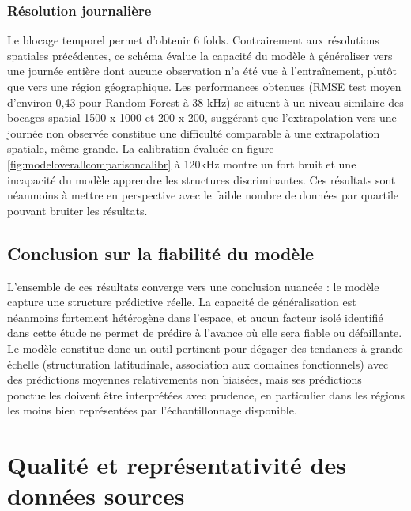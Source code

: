\documentclass[11pt,a4paper,oneside]{report}
\begin{document}
	\subsubsection{Résolution journalière}
	Le blocage temporel permet d'obtenir 6 folds. Contrairement aux résolutions spatiales précédentes, ce schéma évalue la capacité du modèle à généraliser vers une journée entière dont aucune observation n'a été vue à l'entraînement, plutôt que vers une région géographique. Les performances obtenues (RMSE test moyen d'environ 0,43 pour Random Forest à 38 kHz) se situent à un niveau similaire des bocages spatial 1500 x 1000 et 200 x 200, suggérant que l'extrapolation vers une journée non observée constitue une difficulté comparable à une extrapolation spatiale, même grande.
	La calibration évaluée en figure \ref{fig:modeloverallcomparisoncalibr} à 120kHz montre un fort bruit et une incapacité du modèle apprendre les structures discriminantes. Ces résultats sont néanmoins à mettre en perspective avec le faible nombre de données par quartile pouvant bruiter les résultats.  
	
	\subsection{Conclusion sur la fiabilité du modèle}
	L'ensemble de ces résultats converge vers une conclusion nuancée : le modèle capture une structure prédictive réelle. La capacité de généralisation est néanmoins fortement hétérogène dans l'espace, et aucun facteur isolé identifié dans cette étude ne permet de prédire à l'avance où elle sera fiable ou défaillante. Le modèle constitue donc un outil pertinent pour dégager des tendances à grande échelle (structuration latitudinale, association aux domaines fonctionnels) avec des prédictions moyennes relativements non biaisées, mais ses prédictions ponctuelles doivent être interprétées avec prudence, en particulier dans les régions les moins bien représentées par l'échantillonnage disponible. 
	
	\section{Qualité et représentativité des données sources}
\end{document}
